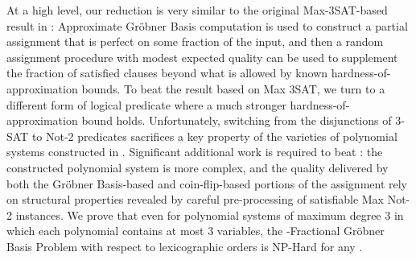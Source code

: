 \documentclass{article}
\begin{document}
\begin{figure}[h!]
{\begin{minipage}{11.8 cm}
\end{minipage}
}
\end{figure}










At a high level, our reduction is very similar to the original Max-3SAT-based result  in \citep{RS}: Approximate Gr\"{o}bner Basis computation is used to construct a partial assignment that is perfect on some fraction of the input, and then a random assignment procedure with modest expected quality can be used to supplement the fraction of satisfied clauses beyond what is allowed by known hardness-of-approximation bounds.
To beat the result based on Max 3SAT, we turn to a different form of logical predicate where a much stronger hardness-of-approximation bound holds. Unfortunately, switching from the disjunctions of 3-SAT to Not-2 predicates sacrifices a key property of the varieties of polynomial systems constructed in \citep{RS}. Significant additional work is required to beat \citep{RS}: the constructed polynomial system is more complex, and the quality delivered by both the Gr\"{o}bner Basis-based and coin-flip-based portions of the assignment rely on structural properties revealed by careful pre-processing of satisfiable Max Not-2 instances. We prove that even for polynomial systems of maximum degree 3 in which each polynomial contains at most 3 variables, the -Fractional Gr\"{o}bner Basis Problem with respect to lexicographic orders is NP-Hard for any .
\end{document}
